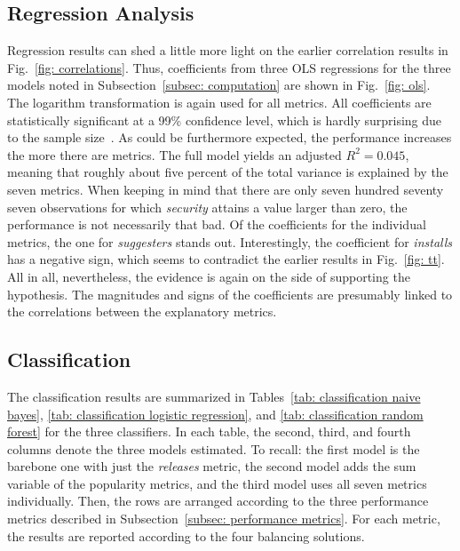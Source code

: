 \documentclass[5p, twocolumn, numbers, sort]{elsarticle}
\begin{document}
\subsection{Regression Analysis}

Regression results can shed a little more light on the earlier correlation
results in Fig.~\ref{fig: correlations}. Thus, coefficients from three OLS
regressions for the three models noted in Subsection~\ref{subsec: computation}
are shown in Fig.~\ref{fig: ols}. The logarithm transformation is again used for
all metrics. All coefficients are statistically significant at a 99\% confidence
level, which is hardly surprising due to the sample size~\cite{Bakan66}. As
could be furthermore expected, the performance increases the more there are
metrics. The full model yields an adjusted $R^2 = 0.045$, meaning that roughly
about five percent of the total variance is explained by the seven metrics. When
keeping in mind that there are only seven hundred seventy seven observations for
which \textit{security} attains a value larger than zero, the performance is not
necessarily that bad. Of the coefficients for the individual metrics, the one
for \textit{suggesters} stands out. Interestingly, the coefficient for
\textit{installs} has a negative sign, which seems to contradict the earlier
results in Fig.~\ref{fig: tt}. All in all, nevertheless, the evidence is again
on the side of supporting the hypothesis. The magnitudes and signs of the
coefficients are presumably linked to the correlations between the explanatory
metrics.

\subsection{Classification}

The classification results are summarized in Tables~\ref{tab: classification
  naive bayes}, \ref{tab: classification logistic regression}, and \ref{tab:
  classification random forest} for the three classifiers. In each table, the
second, third, and fourth columns denote the three models estimated. To recall:
the first model is the barebone one with just the \textit{releases} metric, the
second model adds the sum variable of the popularity metrics, and the third
model uses all seven metrics individually. Then, the rows are arranged according
to the three performance metrics described in Subsection~\ref{subsec:
  performance metrics}. For each metric, the results are reported according to
the four balancing solutions.
\end{document}
